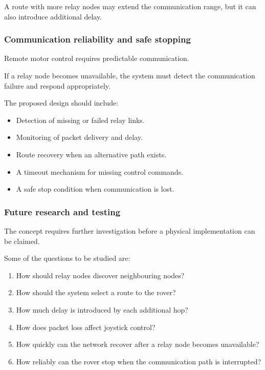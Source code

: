 \documentclass[11pt,a4paper]{article}
\begin{document}
A route with more relay nodes may extend the
communication range, but it can also introduce
additional delay.


\subsubsection{Communication reliability and safe stopping}

Remote motor control requires predictable
communication.

If a relay node becomes unavailable, the system
must detect the communication failure and respond
appropriately.

The proposed design should include:

\begin{itemize}
    \item Detection of missing or failed relay links.
    \item Monitoring of packet delivery and delay.
    \item Route recovery when an alternative path exists.
    \item A timeout mechanism for missing control commands.
    \item A safe stop condition when communication is lost.
\end{itemize}


\subsubsection{Future research and testing}

The concept requires further investigation before
a physical implementation can be claimed.

Some of the questions to be studied are:

\begin{enumerate}
    \item How should relay nodes discover neighbouring nodes?
    \item How should the system select a route to the rover?
    \item How much delay is introduced by each additional hop?
    \item How does packet loss affect joystick control?
    \item How quickly can the network recover after a relay
    node becomes unavailable?
    \item How reliably can the rover stop when the
    communication path is interrupted?
\end{enumerate}
\end{document}
